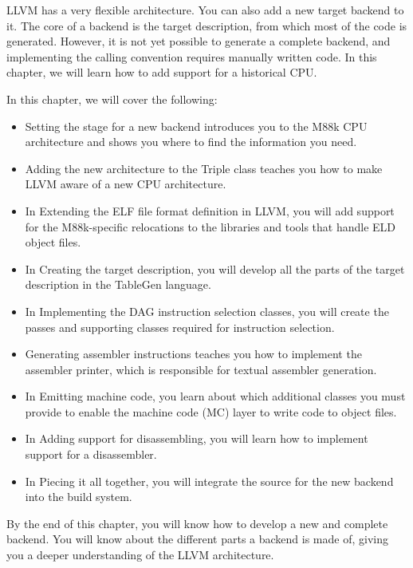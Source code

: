 LLVM has a very flexible architecture. You can also add a new target backend to it. The core of a backend is the target description, from which most of the code is generated. However, it is not yet possible to generate a complete backend, and implementing the calling convention requires manually written code. In this chapter, we will learn how to add support for a historical CPU.\par

In this chapter, we will cover the following:\par

\begin{itemize}
\item Setting the stage for a new backend introduces you to the M88k CPU architecture and shows you where to find the information you need.

\item Adding the new architecture to the Triple class teaches you how to make LLVM aware of a new CPU architecture.

\item In Extending the ELF file format definition in LLVM, you will add support for the M88k-specific relocations to the libraries and tools that handle ELD object files.

\item In Creating the target description, you will develop all the parts of the target description in the TableGen language.

\item In Implementing the DAG instruction selection classes, you will create the passes and supporting classes required for instruction selection.

\item Generating assembler instructions teaches you how to implement the assembler printer, which is responsible for textual assembler generation.

\item In Emitting machine code, you learn about which additional classes you must provide to enable the machine code (MC) layer to write code to object files.

\item In Adding support for disassembling, you will learn how to implement support for a disassembler.

\item In Piecing it all together, you will integrate the source for the new backend into the build system.
\end{itemize}

By the end of this chapter, you will know how to develop a new and complete backend. You will know about the different parts a backend is made of, giving you a deeper understanding of the LLVM architecture.\par




















